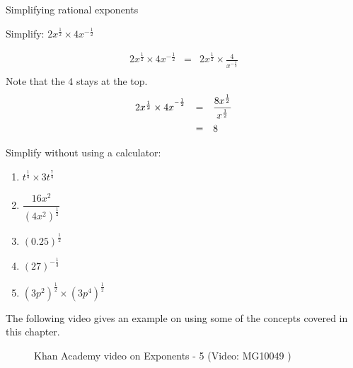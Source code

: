 \begin{wex}
{%
Simplifying rational exponents
}

{
Simplify:
$ 2x^{\frac{1}{2}}\times 4x^{-\frac{1}{2}} $
}
{%
\begin{eqnarray*}
 2x^{\frac{1}{2}} \times 4x^{-\frac{1}{2}} & = & 2x^{\frac{1}{2}} \times \frac{4}{x^{-\frac{1}{2}}} \\
\end{eqnarray*}
Note that the $4$ stays at the top.\\

\begin{equation*}
 \begin{array}{rcl}
 2x^{\frac{1}{2}} \times 4x^{^{-\frac{1}{2}}} & = & \dfrac{8x^{\frac{1}{2}}}{x^{\frac{1}{2}}} \vspace{5pt} \\
					     & = & 8 
 \end{array}

\end{equation*}




}
\end{wex}

\begin{exercises}{}{
Simplify without using a calculator:
\begin{multicols}{2}
\begin{enumerate}[label=\textbf{\arabic*}., itemsep=5pt]
 \item $ t^{\frac{1}{4}} \times 3t^{\frac{7}{4}} $
 \item $ \dfrac{16x^2}{(4x^2)^{\frac{1}{2}}} $
 \item $ (0.25)^{\frac{1}{2}} $
 \item $ (27)^{-\frac{1}{3}} $
 \item $ (3p^2)^{\frac{1}{2}} \times (3p^4)^{\frac{1}{2}} $
\end{enumerate}
\end{multicols}
}
\end{exercises}


The following video gives an example on using some of the concepts covered in this chapter.
\setcounter{subfigure}{0}
\begin{figure}[H] %
\textnormal{Khan Academy video on Exponents - 5}\vspace{.1in} \nopagebreak
\label{m38359*yt-media5}\label{m38359*yt-video5}
 { (Video:  MG10049 )}
\end{figure}    


